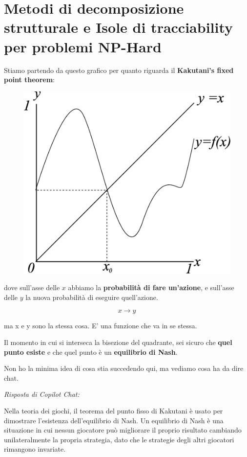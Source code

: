 \section{Metodi di decomposizione strutturale e Isole di tracciability per problemi NP-Hard}

Stiamo partendo da questo grafico per quanto riguarda il \textbf{Kakutani's
    fixed point theorem}:

\begin{figure}[H]
    \centering
    \includegraphics[width=0.7\linewidth]{chapters/images/13-Figure1.1-1.png}
    \caption{}
    \label{fig:1}
\end{figure}

dove sull'asse delle $x$ abbiamo la \textbf{probabilità di fare un'azione}, e
sull'asse delle $y$ la nuova probabilità di eseguire quell'azione.

\[
    x \rightarrow y
\]

ma x e y sono la stessa cosa. E' una funzione che va in se stessa.

Il momento in cui si interseca la bisezione del quadrante, sei sicuro che
\textbf{quel punto esiste} e che quel punto è un \textbf{equilibrio di Nash}.

Non ho la minima idea di cosa stia succedendo qui, ma vediamo cosa ha da dire
chat.

\textit{Risposta di Copilot Chat:}

Nella teoria dei giochi, il teorema del punto fisso di Kakutani è usato per
dimostrare l'esistenza dell'equilibrio di Nash. Un equilibrio di Nash è una
situazione in cui nessun giocatore può migliorare il proprio risultato
cambiando unilateralmente la propria strategia, dato che le strategie degli
altri giocatori rimangono invariate.

